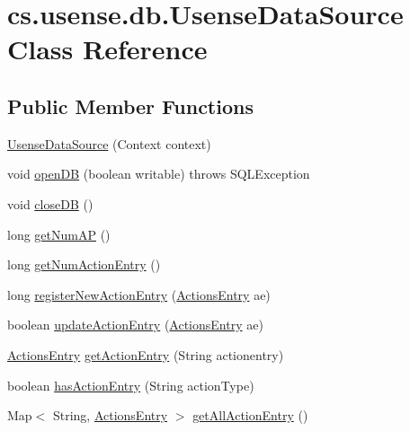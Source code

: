 \hypertarget{classcs_1_1usense_1_1db_1_1_usense_data_source}{}\section{cs.\+usense.\+db.\+Usense\+Data\+Source Class Reference}
\label{classcs_1_1usense_1_1db_1_1_usense_data_source}
\subsection*{Public Member Functions}
\begin{DoxyCompactItemize}
\item 
\hyperlink{classcs_1_1usense_1_1db_1_1_usense_data_source_a0e9b00a5b3a1036ec3f4e9e7ce16ed20}{Usense\+Data\+Source} (Context context)
\item 
void \hyperlink{classcs_1_1usense_1_1db_1_1_usense_data_source_a4fb669af37772373739d32870d995c40}{open\+D\+B} (boolean writable)  throws S\+Q\+L\+Exception 
\item 
void \hyperlink{classcs_1_1usense_1_1db_1_1_usense_data_source_a5be54aab8aee19314587de9be15ff88b}{close\+D\+B} ()
\item 
long \hyperlink{classcs_1_1usense_1_1db_1_1_usense_data_source_a520cf0bb7675132c6a32ead25a8b9b45}{get\+Num\+A\+P} ()
\item 
long \hyperlink{classcs_1_1usense_1_1db_1_1_usense_data_source_a691039457f8be413ad6990a70f83db98}{get\+Num\+Action\+Entry} ()
\item 
long \hyperlink{classcs_1_1usense_1_1db_1_1_usense_data_source_a0afbd8c5efe2b3f4ece076cc8ca5539d}{register\+New\+Action\+Entry} (\hyperlink{classcs_1_1usense_1_1accelerometer_1_1_actions_entry}{Actions\+Entry} ae)
\item 
boolean \hyperlink{classcs_1_1usense_1_1db_1_1_usense_data_source_a1e9a9327d9a72b0f7ed92250ddf59908}{update\+Action\+Entry} (\hyperlink{classcs_1_1usense_1_1accelerometer_1_1_actions_entry}{Actions\+Entry} ae)
\item 
\hyperlink{classcs_1_1usense_1_1accelerometer_1_1_actions_entry}{Actions\+Entry} \hyperlink{classcs_1_1usense_1_1db_1_1_usense_data_source_a1f62185e027045d848892b200209a22b}{get\+Action\+Entry} (String actionentry)
\item 
boolean \hyperlink{classcs_1_1usense_1_1db_1_1_usense_data_source_aefd9dcea92c0d55f36582e9f2aaf0ec2}{has\+Action\+Entry} (String action\+Type)
\item 
Map$<$ String, \hyperlink{classcs_1_1usense_1_1accelerometer_1_1_actions_entry}{Actions\+Entry} $>$ \hyperlink{classcs_1_1usense_1_1db_1_1_usense_data_source_a77f9a3a6d8a2d89c7d1a764cd9106927}{get\+All\+Action\+Entry} ()

\end{DoxyCompactItemize}
